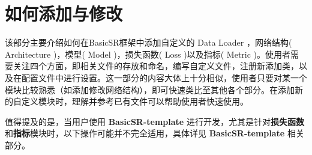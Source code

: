 \documentclass[../main.tex]{subfiles}
\begin{document}
\chapter{如何添加与修改}
\vspace{-2cm}

该部分主要介绍如何在BasicSR框架中添加自定义的 Data Loader ，网络结构( Architecture )，模型( Model )，损失函数( Loss )以及指标( Metric )。使用者需要关注四个方面，即相关文件的存放和命名，编写自定义文件，注册新添加类，以及在配置文件中进行设置。这一部分的内容大体上十分相似，使用者只要对某一个模块比较熟悉（如添加修改网络结构），即可快速类比至其他各个部分。在添加新的自定义模块时，理解并参考已有文件可以帮助使用者快速使用。

值得提及的是，当用户使用 \textbf{BasicSR-template} 进行开发，尤其是针对\textbf{损失函数}和\textbf{指标}模块时，以下操作可能并不完全适用，具体详见 \textbf{BasicSR-template} 相关部分。

\end{document}
